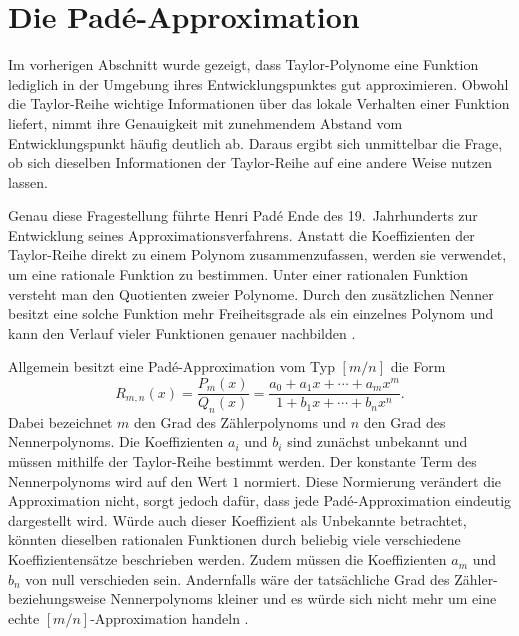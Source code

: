 %
\section{Die Padé-Approximation}
\label{pade:section:pade}

Im vorherigen Abschnitt wurde gezeigt, dass Taylor-Polynome eine Funktion lediglich in der Umgebung ihres Entwicklungspunktes gut approximieren. Obwohl die Taylor-Reihe wichtige Informationen über das lokale Verhalten einer Funktion liefert, nimmt ihre Genauigkeit mit zunehmendem Abstand vom Entwicklungspunkt häufig deutlich ab. Daraus ergibt sich unmittelbar die Frage, ob sich dieselben Informationen der Taylor-Reihe auf eine andere Weise nutzen lassen.

Genau diese Fragestellung führte Henri Padé Ende des 19.~Jahrhunderts zur Entwicklung seines Approximationsverfahrens. Anstatt die Koeffizienten der Taylor-Reihe direkt zu einem Polynom zusammenzufassen, werden sie verwendet, um eine rationale Funktion zu bestimmen. Unter einer rationalen Funktion versteht man den Quotienten zweier Polynome. Durch den zusätzlichen Nenner besitzt eine solche Funktion mehr Freiheitsgrade als ein einzelnes Polynom und kann den Verlauf vieler Funktionen genauer nachbilden \cite{baker_graves_morris_1996}.

Allgemein besitzt eine Padé-Approximation vom Typ \([m/n]\) die Form
\begin{equation}
	R_{m,n}(x)
	=
	\frac{P_m(x)}{Q_n(x)}
	=
	\frac{a_0+a_1x+\cdots+a_mx^m}
	{1+b_1x+\cdots+b_nx^n}.
	\label{pade:eq:allgemein}
\end{equation}
Dabei bezeichnet \(m\) den Grad des Zählerpolynoms und \(n\) den Grad des Nennerpolynoms. Die Koeffizienten \(a_i\) und \(b_i\) sind zunächst unbekannt und müssen mithilfe der Taylor-Reihe bestimmt werden. Der konstante Term des Nennerpolynoms wird auf den Wert \(1\) normiert. Diese Normierung verändert die Approximation nicht, sorgt jedoch dafür, dass jede Padé-Approximation eindeutig dargestellt wird. Würde auch dieser Koeffizient als Unbekannte betrachtet, könnten dieselben rationalen Funktionen durch beliebig viele verschiedene Koeffizientensätze beschrieben werden. Zudem müssen die Koeffizienten \(a_m\) und \(b_n\) von null verschieden sein. Andernfalls wäre der tatsächliche Grad des Zähler- beziehungsweise Nennerpolynoms kleiner und es würde sich nicht mehr um eine echte \([m/n]\)-Approximation handeln \cite{baker_graves_morris_1996}.

